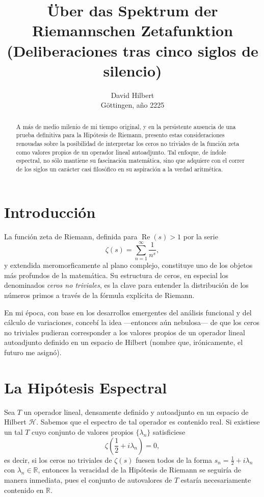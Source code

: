 \documentclass[12pt]{article}
\title{\textbf{Über das Spektrum der Riemannschen Zetafunktion\\[1mm]
(Deliberaciones tras cinco siglos de silencio)}}
\author{David Hilbert\\[1mm]
\small Göttingen, año 2225}
\date{}
\begin{document}
\maketitle

\begin{abstract}
A más de medio milenio de mi tiempo original, y en la persistente ausencia de una prueba definitiva para la Hipótesis de Riemann, presento estas consideraciones renovadas sobre la posibilidad de interpretar los ceros no triviales de la función zeta como valores propios de un operador lineal autoadjunto. Tal enfoque, de índole espectral, no sólo mantiene su fascinación matemática, sino que adquiere con el correr de los siglos un carácter casi filosófico en su aspiración a la verdad aritmética.
\end{abstract}

\section{Introducción}

La función zeta de Riemann, definida para $\operatorname{Re}(s) > 1$ por la serie
\[
\zeta(s) = \sum_{n=1}^\infty \frac{1}{n^s},
\]
y extendida meromorficamente al plano complejo, constituye uno de los objetos más profundos de la matemática. Su estructura de ceros, en especial los denominados \textit{ceros no triviales}, es la clave para entender la distribución de los números primos a través de la fórmula explícita de Riemann.

En mi época, con base en los desarrollos emergentes del análisis funcional y del cálculo de variaciones, concebí la idea —entonces aún nebulosa— de que los ceros no triviales pudieran corresponder a los valores propios de un operador lineal autoadjunto definido en un espacio de Hilbert (nombre que, irónicamente, el futuro me asignó).

\section{La Hipótesis Espectral}

Sea $T$ un operador lineal, densamente definido y autoadjunto en un espacio de Hilbert $\mathcal{H}$. Sabemos que el espectro de tal operador es contenido real. Si existiese un tal $T$ cuyo conjunto de valores propios $\{\lambda_n\}$ satisficiese
\[
\zeta\left(\frac{1}{2} + i \lambda_n \right) = 0,
\]
es decir, si los ceros no triviales de $\zeta(s)$ fuesen todos de la forma $s_n = \frac{1}{2} + i \lambda_n$ con $\lambda_n \in \mathbb{R}$, entonces la veracidad de la Hipótesis de Riemann se seguiría de manera inmediata, pues el conjunto de autovalores de $T$ estaría necesariamente contenido en $\mathbb{R}$.
\end{document}
